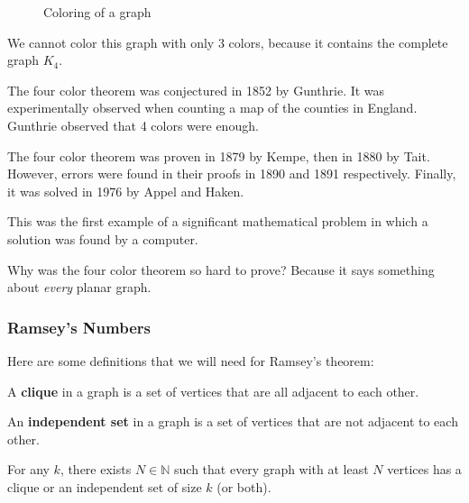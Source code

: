 \begin{figure}[ht]
    \centering
    \caption{Coloring of a graph}
    \label{fig:coloring-of-a-graph}
\end{figure}

\begin{note}
	We cannot color this graph with only 3 colors, because it contains the complete graph \( K_4 \).
\end{note}

The four color theorem was conjectured in 1852 by Gunthrie. It was experimentally observed when counting a map of the counties in England. Gunthrie observed that 4 colors were enough. \par

The four color theorem was proven in 1879 by Kempe, then in 1880 by Tait. However, errors were found in their proofs in 1890 and 1891 respectively. Finally, it was solved in 1976 by Appel and Haken.

\begin{note}
	This was the first example of a significant mathematical problem in which a solution was found by a computer.
\end{note}

Why was the four color theorem so hard to prove? Because it says something about \textit{every} planar graph.

\subsubsection{Ramsey's Numbers}

Here are some definitions that we will need for Ramsey's theorem:

\begin{definition}
	A \textbf{clique} in a graph is a set of vertices that are all adjacent to each other.
\end{definition}

\begin{definition}
	An \textbf{independent set} in a graph is a set of vertices that are not adjacent to each other.
\end{definition}

\begin{theorem}
	For any \( k \), there exists \( N \in  \mathbb{N} \) such that every graph with at least \( N \) vertices has a clique or an independent set of size \( k \) (or both).
\end{theorem}

